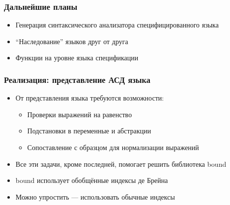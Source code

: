 \begin{frame}[noframenumbering]
\frametitle{Дальнейшие планы}

\begin{itemize}
\item Генерация синтаксического анализатора специфицированного языка
\item ``Наследование'' языков друг от друга
\item Функции на уровне языка спецификации
\end{itemize}

\end{frame}


\begin{frame}[noframenumbering]
\frametitle{Реализация: представление АСД языка}
\begin{itemize}
\item От представления языка требуются возможности:
  \begin{itemize}
    \item Проверки выражений на равенство
    \item Подстановки в переменные и абстракции
    \item Сопоставление с образцом для нормализации выражений
  \end{itemize}
\item Все эти задачи, кроме последней, помогает решить библиотека bound
\item bound использует обобщённые индексы де Брейна
\item Можно упростить --- использовать обычные индексы
\end{itemize}
\end{frame}
